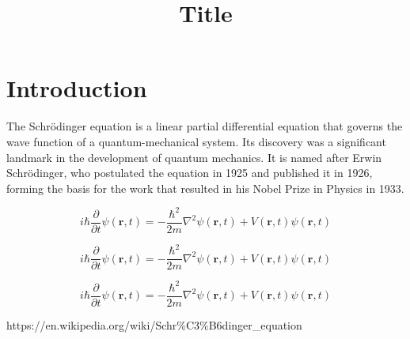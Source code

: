 \documentclass[twocolumn]{revtex4-2}
\begin{document}
    \title{Title}
    \maketitle
    \section{Introduction}
    The Schrödinger equation is a linear partial differential equation that governs the wave function of a quantum-mechanical system. Its discovery was a significant landmark in the development of quantum mechanics. It is named after Erwin Schrödinger, who postulated the equation in 1925 and published it in 1926, forming the basis for the work that resulted in his Nobel Prize in Physics in 1933.\cite{wikipedia_1}

    \begin{equation}
        i\hbar\frac{\partial}{\partial t}\psi(\textbf{r},t)=-\frac{\hbar^{2}}{2m}\nabla^{2}\psi(\textbf{r},t)+V(\textbf{r},t)\psi(\textbf{r},t)
    \end{equation}

    \begin{widetext}
        \begin{equation}
            i\hbar\frac{\partial}{\partial t}\psi(\textbf{r},t)=-\frac{\hbar^{2}}{2m}\nabla^{2}\psi(\textbf{r},t)+V(\textbf{r},t)\psi(\textbf{r},t)
        \end{equation}
    \end{widetext}

    \begin{figure*}
        \begin{equation}
            i\hbar\frac{\partial}{\partial t}\psi(\textbf{r},t)=-\frac{\hbar^{2}}{2m}\nabla^{2}\psi(\textbf{r},t)+V(\textbf{r},t)\psi(\textbf{r},t)
        \end{equation}
    \end{figure*}

    \begin{thebibliography}{999}
         https://en.wikipedia.org/wiki/Schr\%C3\%B6dinger\_equation
    \end{thebibliography}   
\end{document}
